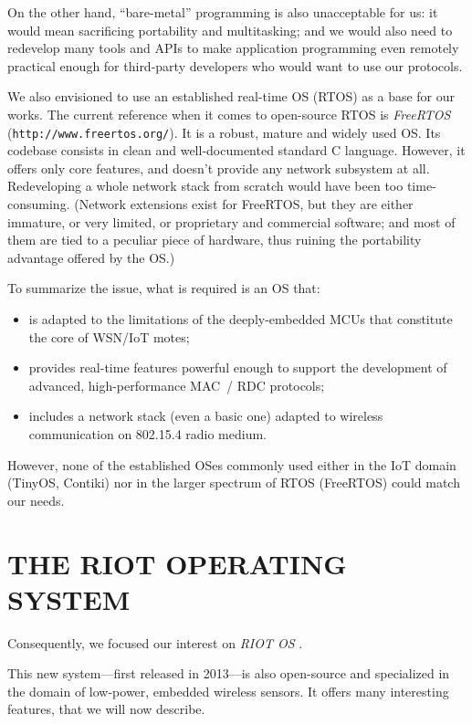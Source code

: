 \documentclass[a4paper,twoside]{article}
\begin{document}
On the other hand, ``bare-metal'' programming is also unacceptable for us:
it would mean sacrificing portability and multitasking; and we would also
need to redevelop many tools and APIs to make application programming
even remotely practical enough for third-party developers who would
want to use our protocols.

We also envisioned to use an established real-time OS (RTOS) as a base
for our works. The current reference when it comes to open-source RTOS is
\emph{FreeRTOS} (\texttt{http://www.freertos.org/}). It is a robust, mature
and widely used OS. Its codebase consists in clean and well-documented
standard C language. However, it offers only core features, and doesn't
provide any network subsystem at all. Redeveloping a whole network stack
from scratch would have been too time-consuming.
(Network extensions exist for FreeRTOS, but they are either immature,
or very limited, or proprietary and commercial software; and most of them
are tied to a peculiar piece of hardware, thus ruining
the portability advantage offered by the OS.)

\bigskip

To summarize the issue, what is required is an OS that:
\begin{itemize}
\item is adapted to the limitations of the deeply-embedded MCUs that
      constitute the core of WSN/IoT motes;
\item provides real-time features powerful enough to support the
      development of advanced, high-performance MAC~/ RDC protocols;
\item includes a network stack (even a basic one) adapted to wireless
      communication on 802.15.4 radio medium.
\end{itemize}
However, none of the established OSes commonly used either in the IoT domain
(TinyOS, Contiki) nor in the larger spectrum of RTOS (FreeRTOS)
could match our needs.


\section{\uppercase{The RIOT Operating System}}

Consequently, we focused our interest on \emph{RIOT OS} \cite{RIOT}.

This new system---first released in 2013---is also open-source and
specialized in the domain of low-power, embedded wireless sensors.
It offers many interesting features, that we will now describe.
\end{document}
